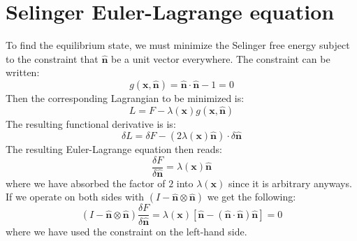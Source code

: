 \documentclass[reqno]{article}
\newcommand{\n}{\hat{\mathbf{n}}}
\begin{document}
\section{Selinger Euler-Lagrange equation}

To find the equilibrium state, we must minimize the Selinger free energy subject to the constraint that $\n$ be a unit vector everywhere.
The constraint can be written:
\begin{equation}
    g(\mathbf{x}, \n) = \n \cdot \n - 1 = 0
\end{equation}
Then the corresponding Lagrangian to be minimized is:
\begin{equation}
    L
    =
    F - \lambda(\mathbf{x}) g(\mathbf{x}, \n)
\end{equation}
The resulting functional derivative is is:
\begin{equation}
    \delta L
    =
    \delta F
    - \left( 2 \lambda(\mathbf{x}) \n \right) \cdot \delta \n
\end{equation}
The resulting Euler-Lagrange equation then reads:
\begin{equation}
    \frac{\delta F}{\delta \n}
    =
    \lambda(\mathbf{x}) \n
\end{equation}
where we have absorbed the factor of $2$ into $\lambda(\mathbf{x})$ since it is arbitrary anyways.
If we operate on both sides with $(I - \n \otimes \n)$ we get the following:
\begin{equation}
    (I - \n \otimes \n) \frac{\delta F}{\delta \n}
    =
    \lambda(\mathbf{x}) \left[\n - \left(\n \cdot \n\right) \n \right]
    = 
    0
\end{equation}
where we have used the constraint on the left-hand side.
\end{document}
